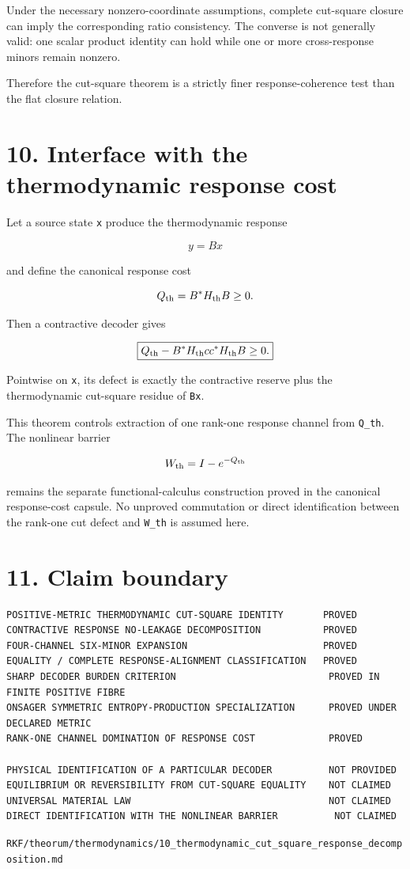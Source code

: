 Under the necessary nonzero-coordinate assumptions, complete cut-square closure can imply the corresponding ratio consistency. The converse is not generally valid: one scalar product identity can hold while one or more cross-response minors remain nonzero.

Therefore the cut-square theorem is a strictly finer response-coherence test than the flat closure relation.

\hypertarget{interface-with-the-thermodynamic-response-cost}{%
\section{10. Interface with the thermodynamic response cost}\label{interface-with-the-thermodynamic-response-cost}}

Let a source state \texttt{x} produce the thermodynamic response

\[
y=Bx
\]

and define the canonical response cost

\[
Q_{\rm th}=B^*H_{\rm th}B\ge0.
\]

Then a contractive decoder gives

\[
\boxed{
Q_{\rm th}
-
B^*H_{\rm th}cc^*H_{\rm th}B
\ge0.
}
\]

Pointwise on \texttt{x}, its defect is exactly the contractive reserve plus the thermodynamic cut-square residue of \texttt{Bx}.

This theorem controls extraction of one rank-one response channel from \texttt{Q\_th}. The nonlinear barrier

\[
W_{\rm th}=I-e^{-Q_{\rm th}}
\]

remains the separate functional-calculus construction proved in the canonical response-cost capsule. No unproved commutation or direct identification between the rank-one cut defect and \texttt{W\_th} is assumed here.

\hypertarget{claim-boundary}{%
\section{11. Claim boundary}\label{claim-boundary}}

\begin{verbatim}
POSITIVE-METRIC THERMODYNAMIC CUT-SQUARE IDENTITY       PROVED
CONTRACTIVE RESPONSE NO-LEAKAGE DECOMPOSITION           PROVED
FOUR-CHANNEL SIX-MINOR EXPANSION                        PROVED
EQUALITY / COMPLETE RESPONSE-ALIGNMENT CLASSIFICATION   PROVED
SHARP DECODER BURDEN CRITERION                           PROVED IN FINITE POSITIVE FIBRE
ONSAGER SYMMETRIC ENTROPY-PRODUCTION SPECIALIZATION      PROVED UNDER DECLARED METRIC
RANK-ONE CHANNEL DOMINATION OF RESPONSE COST             PROVED

PHYSICAL IDENTIFICATION OF A PARTICULAR DECODER          NOT PROVIDED
EQUILIBRIUM OR REVERSIBILITY FROM CUT-SQUARE EQUALITY    NOT CLAIMED
UNIVERSAL MATERIAL LAW                                   NOT CLAIMED
DIRECT IDENTIFICATION WITH THE NONLINEAR BARRIER          NOT CLAIMED
\end{verbatim}

\begin{flushright}\small\texttt{RKF/theorum/thermodynamics/10\_thermodynamic\_cut\_square\_response\_decomposition.md}\end{flushright}
